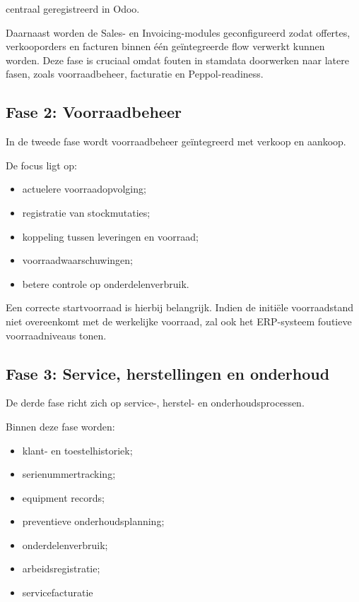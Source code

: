 centraal geregistreerd in Odoo.

Daarnaast worden de Sales- en Invoicing-modules geconfigureerd zodat offertes, verkooporders en facturen binnen één geïntegreerde flow verwerkt kunnen worden. Deze fase is cruciaal omdat fouten in stamdata doorwerken naar latere fasen, zoals voorraadbeheer, facturatie en Peppol-readiness.

\subsection{Fase 2: Voorraadbeheer}

In de tweede fase wordt voorraadbeheer geïntegreerd met verkoop en aankoop.

De focus ligt op:
\begin{itemize}
    \item actuelere voorraadopvolging;
    \item registratie van stockmutaties;
    \item koppeling tussen leveringen en voorraad;
    \item voorraadwaarschuwingen;
    \item betere controle op onderdelenverbruik.
\end{itemize}

Een correcte startvoorraad is hierbij belangrijk. Indien de initiële voorraadstand niet overeenkomt met de werkelijke voorraad, zal ook het ERP-systeem foutieve voorraadniveaus tonen.

\subsection{Fase 3: Service, herstellingen en onderhoud}

De derde fase richt zich op service-, herstel- en onderhoudsprocessen.

Binnen deze fase worden:
\begin{itemize}
    \item klant- en toestelhistoriek;
    \item serienummertracking;
    \item equipment records;
    \item preventieve onderhoudsplanning;
    \item onderdelenverbruik;
    \item arbeidsregistratie;
    \item servicefacturatie
\end{itemize}

